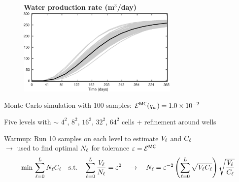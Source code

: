 \begin{frame}{\name{}}
    \begin{figure}
        \centering
        \textbf{Water production rate (m$^3$/day)}
        \includegraphics[width = 0.7\textwidth]{figures/example-1/water-rate.eps}
    \end{figure}
    \begin{squarelist}
        \item Monte Carlo simulation with 100 samples: $\mathcal{E}^{\mathsf{MC}}(q_w) = 1.0\times10^{-2}$
    \end{squarelist}
\end{frame}

\begin{frame}{\name{}}
    \begin{figure}
        \centering
    \end{figure}
    \begin{squarelist}
        \item<1-> Five levels with $\sim$ $4^2$, $8^2$, $16^2$, $32^2$, $64^2$ cells + refinement around wells
        \item<2-> Warmup: Run 10 samples on each level to estimate $V_\ell$ and $C_\ell$ \\
        $\rightarrow$ used to find optimal $N_\ell$ for tolerance $\varepsilon = \mathcal{E}^{{\mathsf{MC}}}$
        \begin{equation*}
            \min\, \sum_{\ell = 0}^L N_\ell C_\ell \quad \text{s.t.} \quad \sum_{\ell = 0}^L\frac{V_\ell}{N_\ell} = \varepsilon^2 \quad \rightarrow \quad N_\ell = \varepsilon^{-2}\left(\sum_{\ell = 0}^L \sqrt{V_\ell C_\ell}\right)\sqrt{\frac{V_\ell}{C_\ell}}
        \end{equation*}
    \end{squarelist}
\end{frame}

